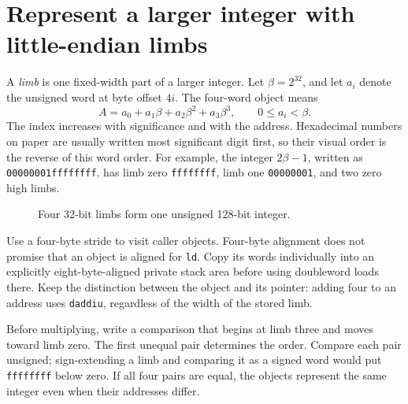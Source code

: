 \section{Represent a larger integer with little-endian limbs}
A \emph{limb} is one fixed-width part of a larger integer. Let \(\beta=2^{32}\), and
let \(a_i\) denote the unsigned word at byte offset \(4i\). The four-word object means
\[
A=a_0+a_1\beta+a_2\beta^2+a_3\beta^3,\qquad 0\leq a_i<\beta.
\]
The index increases with significance and with the address. Hexadecimal numbers on
paper are usually written most significant digit first, so their visual order is the
reverse of this word order. For example, the integer \(2\beta-1\), written as
\texttt{00000001ffffffff}, has limb zero \texttt{ffffffff}, limb one
\texttt{00000001}, and two zero high limbs.

\begin{figure}[htbp]
\centering
{}
\caption{Four 32-bit limbs form one unsigned 128-bit integer.}\label{rsa-limb-layout}
\end{figure}

Use a four-byte stride to visit caller objects. Four-byte alignment does not promise
that an object is aligned for \texttt{ld}. Copy its words individually into an
explicitly eight-byte-aligned private stack area before using doubleword loads there.
Keep the distinction between the object and its pointer: adding four to an address
uses \texttt{daddiu}, regardless of the width of the stored limb.

Before multiplying, write a comparison that begins at limb three and moves toward
limb zero. The first unequal pair determines the order. Compare each pair unsigned;
sign-extending a limb and comparing it as a signed word would put \texttt{ffffffff} below zero. If all four pairs are
equal, the objects represent the same integer even when their addresses differ.
